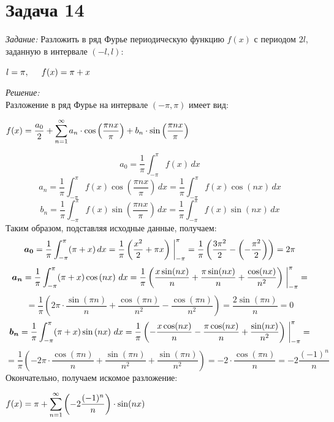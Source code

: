 \documentclass[14pt,fleqn]{extarticle}
\def\at{
	\left.
	\vphantom{\int}
	\right|
}
\begin{document}
	\section*{Задача 14}
	\textit{Задание:} Разложить в ряд Фурье периодическую функцию $f(x)$ с периодом $2l$, заданную в интервале $(-l, l)$:
	\begin{center}
		$l = \pi, \hspace{0.5cm} f(x) = \pi + x$
	\end{center}

	\textit{Решение:}\\
	Разложение в ряд Фурье на интервале $(-\pi, \pi)$ имеет вид:
	\begin{center}
		$f(x) = \dfrac{a_0}{2} + \smashoperator[r]{\sum_{n=1}^{\infty}}a_n \cdot \cos\left(\dfrac{\pi n x}{\pi}\right) + b_n \cdot \sin\left(\dfrac{\pi n x}{\pi}\right)$
	\end{center}
	\[ a_0 = \dfrac{1}{\pi} \int_{-\pi}^{\pi} f(x) \,dx \]
	\[ a_n = \dfrac{1}{\pi} \int_{-\pi}^{\pi} f(x) \cos\left(\dfrac{\pi n x}{\pi}\right) \,dx = \dfrac{1}{\pi} \int_{-\pi}^{\pi} f(x) \cos\left(n x\right) \,dx \]
	\[ b_n = \dfrac{1}{\pi} \int_{-\pi}^{\pi} f(x) \sin\left(\dfrac{\pi n x}{\pi}\right) \,dx = \dfrac{1}{\pi} \int_{-\pi}^{\pi} f(x) \sin\left(n x\right) \,dx \]
	Таким образом, подставляя исходные данные, получаем:
	\[ \boldsymbol{a_0} = \dfrac{1}{\pi} \int_{-\pi}^{\pi} (\pi + x) \,dx = \dfrac{1}{\pi} \left(\dfrac{x^2}{2} + \pi x\right) \at_{-\pi}^{\pi} = \dfrac{1}{\pi} \left(\dfrac{3\pi^2}{2} - \left(-\dfrac{\pi^2}{2}\right)\right) = 2\pi \]
	\vspace{1cm}	
	\[ \boldsymbol{a_n} = \dfrac{1}{\pi} \int_{-\pi}^{\pi} (\pi + x) \cos\left(n x\right) \,dx = \dfrac{1}{\pi} \left(\dfrac{x \sin(nx)}{n} + \dfrac{\pi \sin(nx)}{n} + \dfrac{\cos(nx)}{n^2}\right) \at_{-\pi}^{\pi} = \]
	\[	= \dfrac{1}{\pi} \left(2\pi\cdot\dfrac{\sin(\pi n)}{n} + \dfrac{\cos(\pi n)}{n^2} - \dfrac{\cos(\pi n)}{n^2}\right) = \dfrac{2\sin(\pi n)}{n} = 0 \]
	\vspace{1cm}
	\[ \boldsymbol{b_n} = \dfrac{1}{\pi} \int_{-\pi}^{\pi} (\pi + x) \sin\left(n x\right) \,dx = \dfrac{1}{\pi} \left(-\dfrac{x \cos(nx)}{n} - \dfrac{\pi \cos(nx)}{n} + \dfrac{\sin(nx)}{n^2}\right) \at_{-\pi}^{\pi} = \]
	\[	= \dfrac{1}{\pi} \left(-2\pi\cdot\dfrac{\cos(\pi n)}{n} + \dfrac{\sin(\pi n)}{n^2} + \dfrac{\sin(\pi n)}{n^2}\right) = -2\cdot\dfrac{\cos(\pi n)}{n}= -2\dfrac{(-1)^n}{n}\]
	\newpage
	Окончательно, получаем искомое разложение:
	\begin{center}
		$f(x) = \pi + \smashoperator[r]{\sum_{n=1}^{\infty}}\left(-2\dfrac{(-1)^n}{n}\right)\cdot\sin(nx)$
	\end{center}
\end{document}
